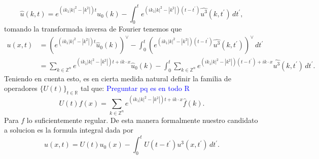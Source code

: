 \documentclass[12pt]{article}
\newcommand\R{\ensuremath{\mathbb{R}}}
\newcommand\Z{\ensuremath{\mathbb{Z}}}
\begin{document}
$$\widehat{u}(k,t)=e^{(ik_1|k|^2-|k^2|)t}\widehat{u}_0(k)-\int_0^te^{(ik_1|k|^2-|k^2|)(t-t^\prime)}\widehat{u^3}(k,t^\prime)\,dt^\prime,$$
tomando la transformada inversa de Fourier tenemos que
\begin{align*}
    u(x,t)&=(e^{(ik_1|k|^2-|k^2|)t}\widehat{u}_0(k))^{\vee}-\int_0^t(e^{(ik_1|k|^2-|k^2|)(t-t^\prime)}\widehat{u^3}(k,t^\prime))^{\vee}\,dt^\prime\\
    &=\sum_{k\in\Z^n}e^{(ik_1|k|^2-|k^2|)t+ik\cdot x}\widehat{u}_0(k)-\int_0^t\sum_{k\in\Z^n}e^{(ik_1|k|^2-|k^2|)(t-t^\prime)+ik\cdot x}\widehat{u^3}(k,t^\prime)\,dt^\prime.
\end{align*}
Teniendo en cuenta esto, es en cierta medida natural definir la familia de operadores $\{U(t)\}_{t\in\R}$ tal que:
\textcolor{blue}{Preguntar pq es en todo R}
$$U(t)f(x)=\sum_{k\in\Z^n}e^{(ik_1|k|^2-|k^2|)t+ik\cdot x}\widehat{f}(k).$$
Para $f$ lo suficientemente regular. De esta manera formalmente nuestro candidato a solucion es la formula integral dada por
$$u(x,t)=U(t)u_0(x)-\int_0^tU(t-t^\prime)u^3(x,t^\prime)\,dt^\prime.$$
\newpage



\nocite{*}
\end{document}
